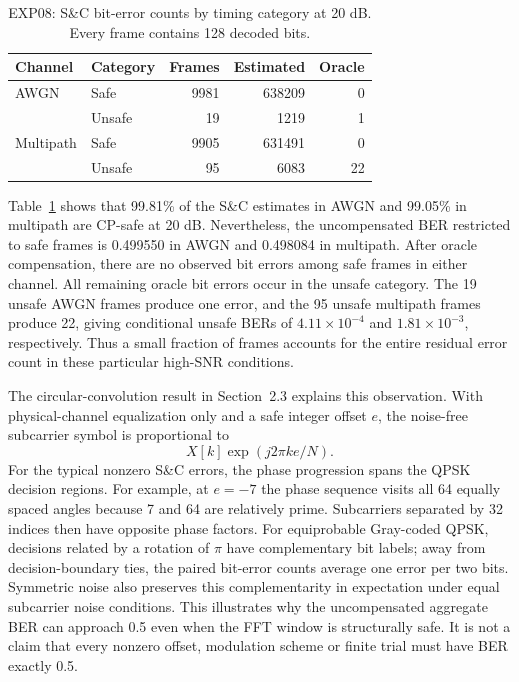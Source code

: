 \begin{table}[!htbp]
\centering\small
\caption[EXP08: S\&C errors by timing category at 20 dB.]{EXP08: S\&C bit-error counts by timing category at 20 dB. Every frame contains 128 decoded bits.}
\label{tab:ch5safe}
\begin{tabular}{llrrr}\hline
Channel&Category&Frames&Estimated&Oracle\\\hline
AWGN&Safe&9981&638209&0\\
&Unsafe&19&1219&1\\\hline
Multipath&Safe&9905&631491&0\\
&Unsafe&95&6083&22\\\hline
\end{tabular}
\end{table}

Table~\ref{tab:ch5safe} shows that 99.81\% of the S\&C estimates in AWGN and 99.05\% in multipath are CP-safe at 20 dB. Nevertheless, the uncompensated BER restricted to safe frames is 0.499550 in AWGN and 0.498084 in multipath. After oracle compensation, there are no observed bit errors among safe frames in either channel. All remaining oracle bit errors occur in the unsafe category. The 19 unsafe AWGN frames produce one error, and the 95 unsafe multipath frames produce 22, giving conditional unsafe BERs of $4.11\times10^{-4}$ and $1.81\times10^{-3}$, respectively. Thus a small fraction of frames accounts for the entire residual error count in these particular high-SNR conditions.

The circular-convolution result in Section~2.3 explains this observation. With physical-channel equalization only and a safe integer offset $e$, the noise-free subcarrier symbol is proportional to
\begin{equation}
X[k]\exp(j2\pi ke/N).
\end{equation}
For the typical nonzero S\&C errors, the phase progression spans the QPSK decision regions. For example, at $e=-7$ the phase sequence visits all 64 equally spaced angles because 7 and 64 are relatively prime. Subcarriers separated by 32 indices then have opposite phase factors. For equiprobable Gray-coded QPSK, decisions related by a rotation of $\pi$ have complementary bit labels; away from decision-boundary ties, the paired bit-error counts average one error per two bits. Symmetric noise also preserves this complementarity in expectation under equal subcarrier noise conditions. This illustrates why the uncompensated aggregate BER can approach 0.5 even when the FFT window is structurally safe. It is not a claim that every nonzero offset, modulation scheme or finite trial must have BER exactly 0.5.

